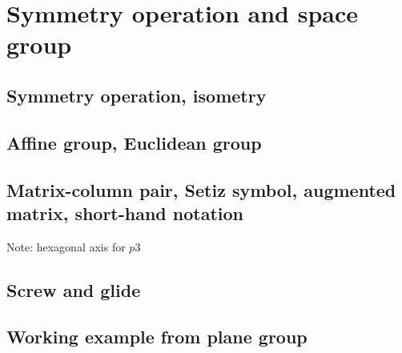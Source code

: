 \section{\label{sec:operation}Symmetry operation and space group}

\subsection{Symmetry operation, isometry}

\subsection{Affine group, Euclidean group}

\subsection{Matrix-column pair, Setiz symbol, augmented matrix, short-hand notation}

Note: hexagonal axis for $p3$

\subsection{Screw and glide}

\subsection{Working example from plane group}
